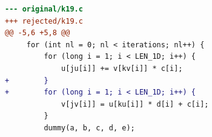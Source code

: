 \begin{lstlisting}[language=diff,basicstyle=\ttfamily\scriptsize,breaklines=true,caption={tsvc_c2/k19 — attempt 1 of 12, rejected by the gate at 'correctness': Program output changed — the patched program is NOT semantically equivalent to the original. / output differs and no numerical slack is in effect}]
--- original/k19.c
+++ rejected/k19.c
@@ -5,6 +5,8 @@
     for (int nl = 0; nl < iterations; nl++) {
         for (long i = 1; i < LEN_1D; i++) {
             u[ju[i]] += v[kv[i]] * c[i];
+        }
+        for (long i = 1; i < LEN_1D; i++) {
             v[jv[i]] = u[ku[i]] * d[i] + c[i];
         }
         dummy(a, b, c, d, e);
\end{lstlisting}
